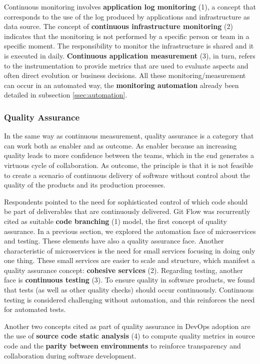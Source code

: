 Continuous monitoring involves \textbf{application log monitoring} (1), a
concept that corresponds to the use of the log produced by
applications and infrastructure as data source. The concept of
\textbf{continuous infrastructure monitoring} (2) indicates that the monitoring
is not performed by a specific person or team in a specific moment. The
responsibility to monitor the infrastructure is shared and it is executed in
daily. \textbf{Continuous application measurement} (3), in turn, refers to
the instrumentation to provide metrics that are used to evaluate aspects and
often direct evolution or business decisions. All these monitoring/measurement
can occur in an automated way, the \textbf{monitoring automation} already been
detailed in subsection \ref{ssec:automation}.

\subsubsection{Quality Assurance}

In the same way as continuous measurement, quality assurance is a category that
can work both as enabler and as outcome. As enabler because an increasing quality
leads to more confidence between the teams, which in the end generates a virtuous
cycle of collaboration. As outcome, the principle is that it is not
feasible to create a scenario of continuous delivery of software without control
about the quality of the products and its production processes.

Respondents pointed to the need for sophisticated control of which code should
be part of deliverables that are continuously delivered. Git Flow was
recurrently cited as suitable \textbf{code branching} (1) model, the first
concept of quality assurance.
In a previous section, we explored the automation face of
microservices and testing. These elements have also a quality assurance face.
Another characteristic of microservices is the need for small services focusing
in doing only one thing. These small services are easier to scale and
structure, which manifest a quality assurance concept: \textbf{cohesive
services} (2). Regarding testing, another face is \textbf{continuous
testing} (3). To ensure quality in software products, we found that
tests (as well as other quality checks) should occur continuously. Continuous testing
is considered challenging without automation, and this reinforces the need for automated
tests.

Another two concepts cited as part of quality assurance in DevOps adoption are
the use of \textbf{source code static analysis} (4) to compute quality metrics in
source code and the \textbf{parity between environments} to
reinforce transparency and collaboration during software development.
